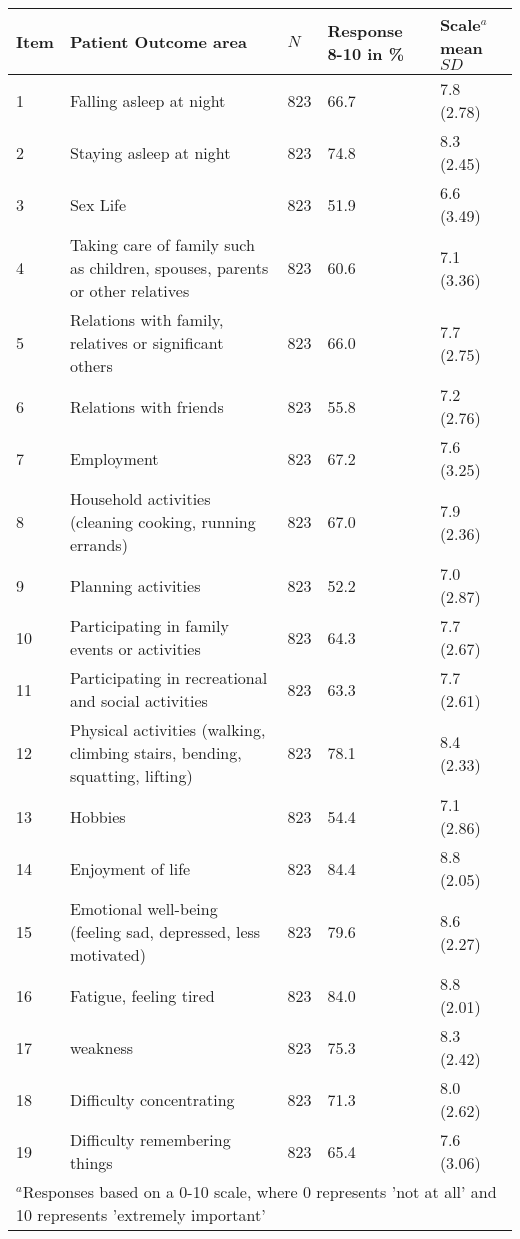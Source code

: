\begin{table}[ht]
\begin{scriptsize}
\begin{tabular}{m{0.5cm}p{5cm}m{0.5cm}m{1.5cm}m{1.5cm}}
	\toprule
	Item & Patient Outcome area & {$N$} & {Response 8-10 in \%} & {Scale$^{a}$ mean $\mathit{SD}$}\\
	\midrule
	1& Falling asleep at night 	& 823 &66.7&7.8 (2.78)\\
	2& Staying asleep at night 	& 823 &74.8&8.3 (2.45)\\
	3& Sex Life 				& 823 &51.9&6.6 (3.49)\\
	4& Taking care of family such as children, spouses, parents or other relatives & 823 &60.6&7.1 (3.36)\\
	5& Relations with family, relatives or significant others & 823 &66.0&7.7 (2.75)\\
	6& Relations with friends	& 823 &55.8&7.2 (2.76)\\
	7& Employment				& 823 &67.2&7.6 (3.25)\\
	8& Household activities (cleaning cooking, running errands)& 823 &67.0&7.9 (2.36)\\
	9& Planning activities		& 823 &52.2&7.0 (2.87)\\
	10& Participating in family events or activities& 823 &64.3&7.7 (2.67)\\
	11& Participating in recreational and social activities& 823 &63.3&7.7 (2.61)\\
	12& Physical activities (walking, climbing stairs, bending, squatting, lifting)& 823 &78.1&8.4 (2.33)\\
	13& Hobbies					& 823 &54.4&7.1 (2.86)\\
	14& Enjoyment of life 		& 823 &84.4&8.8 (2.05)\\
	15& Emotional well-being (feeling sad, depressed, less motivated)& 823 &79.6&8.6 (2.27)\\
	16& Fatigue, feeling tired 	& 823 &84.0&8.8 (2.01)\\
	17& weakness 				& 823 &75.3&8.3 (2.42)\\
	18& Difficulty concentrating& 823 &71.3&8.0 (2.62)\\
	19& Difficulty remembering things& 823 &65.4&7.6 (3.06)\\
	\midrule[\heavyrulewidth]
	\multicolumn{5}{p{10cm}}{$^a$Responses based on a 0-10 scale, where 0 represents 'not at all' and 10 represents 'extremely important'}
	\end{tabular}
	\end{scriptsize}
	\end{table}

	